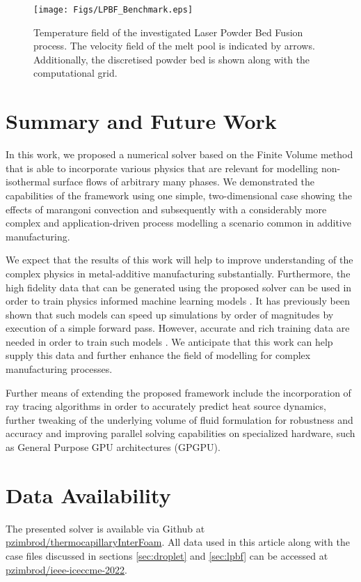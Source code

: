 \documentclass[conference,final]{IEEEtran}
\begin{document}
\begin{figure}[!t]
  \centering
  \texttt{[image: Figs/LPBF\_Benchmark.eps]}
  \caption{Temperature field of the investigated Laser Powder Bed Fusion process. The velocity field of the melt pool is indicated by arrows. Additionally, the discretised powder bed is shown along with the computational grid.}
  \label{fig:lpbf-benchmark}
\end{figure}

\section{Summary and Future Work}

In this work, we proposed a numerical solver based on the Finite Volume method that is able to incorporate various physics that are relevant for modelling non-isothermal surface flows of arbitrary many phases. We demonstrated the capabilities of the framework using one simple, two-dimensional case showing the effects of marangoni convection and subsequently with a considerably more complex and application-driven process modelling a scenario common in additive manufacturing.

We expect that the results of this work will help to improve understanding of the complex physics in metal-additive manufacturing substantially. Furthermore, the high fidelity data that can be generated using the proposed solver can be used in order to train physics informed machine learning models \cite{karniadakisPhysicsinformedMachineLearning2021}. It has previously been shown that such models can speed up simulations by order of magnitudes by execution of a simple forward pass. However, accurate and rich training data are needed in order to train such models \cite{liFourierNeuralOperator2021,luDeepONetLearningNonlinear2020}. We anticipate that this work can help supply this data and further enhance the field of modelling for complex manufacturing processes.

Further means of extending the proposed framework include the incorporation of ray tracing algorithms in order to accurately predict heat source dynamics, further tweaking of the underlying volume of fluid formulation for robustness and accuracy and improving parallel solving capabilities on specialized hardware, such as General Purpose GPU architectures (GPGPU).

\section{Data Availability}\label{sec:data}

The presented solver is available via Github at \href{https://github.com/pzimbrod/thermocapillaryInterFoam}{pzimbrod/thermocapillaryInterFoam}. All data used in this article along with the case files discussed in sections \ref{sec:droplet} and \ref{sec:lpbf} can be accessed at \href{https://github.com/pzimbrod/ieee-iceccme-2022}{pzimbrod/ieee-iceccme-2022}.



\end{document}
